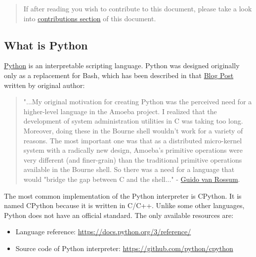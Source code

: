 \documentclass[
]{article}
\begin{document}
\begin{quote}
If after reading you wish to contribute to this document, please take a
look into
\protect\hyperlink{contributions-to-this-document}{contributions
section} of this document.
\end{quote}

\hypertarget{what-is-python}{%
\subsection{What is Python}\label{what-is-python}}

\href{https://www.python.org/}{Python} is an interpretable scripting
language. Python was designed originally only as a replacement for Bash,
which has been described in that
\href{https://l.facebook.com/l.php?u=https\%3A\%2F\%2Fpython-history.blogspot.com\%2F2009\%2F01\%2Fpersonal-history-part-1-cwi.html\%3Ffbclid\%3DIwAR1v3C4KHiJtBbG4NYVY2o__lMchCNVKQGe2ozoI-gcxnwCYNvcdxzD_sHU\&h=AT1quzeQEvwmfgFXMnWscdzCzWIJrbgoyQKX22c6w2yzVSaUt9LBMdrL66UgpJaz3rh_-BLBa8FVu3sdV_NzuiuSTU4XPZ5zADu4wGoASMxLcRR-n7Emwogq664lszQUbTZM\&__tn__=-UK-R\&c\%5B0\%5D=AT3TC-zKWleGu9UDUQg6mUKEWZ-El56OnANy8jfnUXLhGPAIHIfrXp6ZVEhtbJztlbUu_3OhD9sRJ7JA_F3ETiL3BsR0dKi58KfhLRwPsHtyRauqYQXDGtxnIeFWRyAxyop0WlHBapKPdoYnVar9DUy3pudNCdWdZ1c4wlxvNA3qoA}{Blog
Post} written by original author:

\begin{quote}
"...My original motivation for creating Python was the perceived need
for a higher-level language in the Amoeba project. I realized that the
development of system administration utilities in C was taking too long.
Moreover, doing these in the Bourne shell wouldn't work for a variety of
reasons. The most important one was that as a distributed micro-kernel
system with a radically new design, Amoeba's primitive operations were
very different (and finer-grain) than the traditional primitive
operations available in the Bourne shell. So there was a need for a
language that would "bridge the gap between C and the shell..." -
\href{https://en.wikipedia.org/wiki/Guido_van_Rossum}{Guido van Rossum}.
\end{quote}

The most common implementation of the Python interpreter is CPython. It
is named CPython because it is written in C/C++. Unlike some other
languages, Python does not have an official standard. The only available
resources are:

\begin{itemize}
\item
  Language reference: \url{https://docs.python.org/3/reference/}
\item
  Source code of Python interpreter:
  \url{https://github.com/python/cpython}
\end{itemize}
\end{document}

